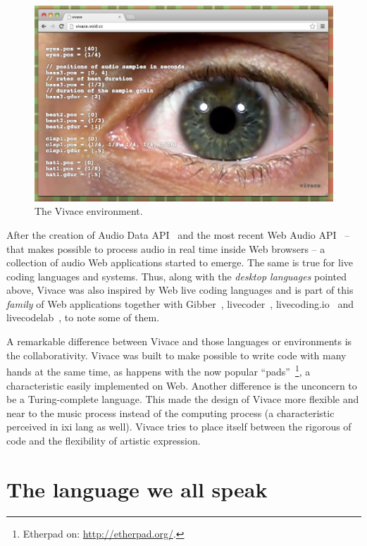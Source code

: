 \documentclass[letterpaper, 12pt]{article}
\begin{document}
\begin{figure}[htpb]
  \begin{center}
    \includegraphics[scale=.3]{img/fig_vivace.png}
    \caption{The Vivace environment.}
    \label{fig:vivace}
  \end{center}
\end{figure}

After the creation of Audio Data API~\citep*{audiodata} and the most
recent Web Audio API~\citep*{webaudio} -- that makes possible to
process audio in real time inside Web browsers -- a collection of
audio Web applications started to emerge. The same is true for live
coding languages and systems.  Thus, along with the \textit{desktop
  languages} pointed above, Vivace was also inspired by Web live
coding languages and is part of this \textit{family} of Web
applications together with Gibber~\citep*{gibber},
livecoder~\citep*{livecoder}, livecoding.io~\citep*{livecodingio} and
livecodelab~\citep*{livecodelab}, to note some of them.

A remarkable difference between Vivace and those languages or
environments is the collaborativity. Vivace was built to make possible
to write code with many hands at the same time, as happens with the
now popular ``pads''~\footnote{Etherpad on:
  \url{http://etherpad.org/}.}, a characteristic easily implemented on
Web.  Another difference is the unconcern to be a Turing-complete
language. This made the design of Vivace more flexible and near to the
music process instead of the computing process (a characteristic
perceived in ixi lang as well). Vivace tries to place itself between
the rigorous of code and the flexibility of artistic expression.

\section{The language we all speak}
\end{document}
